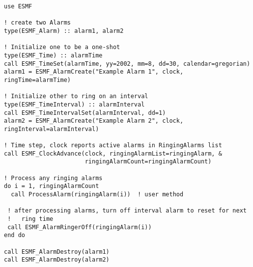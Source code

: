 
\begin{verbatim}
use ESMF

! create two Alarms
type(ESMF_Alarm) :: alarm1, alarm2

! Initialize one to be a one-shot
type(ESMF_Time) :: alarmTime
call ESMF_TimeSet(alarmTime, yy=2002, mm=8, dd=30, calendar=gregorian)
alarm1 = ESMF_AlarmCreate("Example Alarm 1", clock, ringTime=alarmTime)

! Initialize other to ring on an interval
type(ESMF_TimeInterval) :: alarmInterval
call ESMF_TimeIntervalSet(alarmInterval, dd=1)
alarm2 = ESMF_AlarmCreate("Example Alarm 2", clock, ringInterval=alarmInterval)

! Time step, clock reports active alarms in RingingAlarms list
call ESMF_ClockAdvance(clock, ringingAlarmList=ringingAlarm, &
                       ringingAlarmCount=ringingAlarmCount)

! Process any ringing alarms
do i = 1, ringingAlarmCount
  call ProcessAlarm(ringingAlarm(i))  ! user method

 ! after processing alarms, turn off interval alarm to reset for next
 !   ring time
 call ESMF_AlarmRingerOff(ringingAlarm(i))
end do

call ESMF_AlarmDestroy(alarm1)
call ESMF_AlarmDestroy(alarm2)
\end{verbatim}
